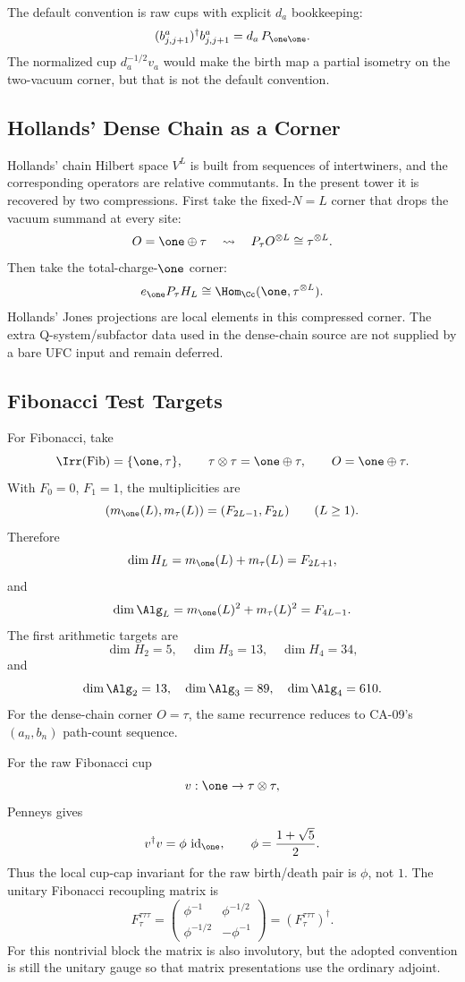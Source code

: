 The default convention is raw cups with explicit \(d_a\) bookkeeping:
\[
  (b^a_{j,j+1})^\dagger b^a_{j,j+1}
  =
  d_a\,P_{\one\one}.
\]
The normalized cup \(d_a^{-1/2}v_a\) would make the birth map a partial
isometry on the two-vacuum corner, but that is not the default convention.

\subsection{Hollands' Dense Chain as a Corner}

Hollands' chain Hilbert space \(V^L\) is built from sequences of intertwiners,
and the corresponding operators are relative commutants.  In the present
tower it is recovered by two compressions.  First take the fixed-\(N=L\) corner
that drops the vacuum summand at every site:
\[
  O=\one\oplus\tau
  \quad\leadsto\quad
  P_\tau O^{\otimes L}\cong \tau^{\otimes L}.
\]
Then take the total-charge-\(\one\) corner:
\[
  e_{\one}P_\tau H_L
  \cong
  \Hom_{\Cc}(\one,\tau^{\otimes L}).
\]
Hollands' Jones projections are local elements in this compressed corner.  The
extra Q-system/subfactor data used in the dense-chain source are not supplied
by a bare UFC input and remain deferred.

\subsection{Fibonacci Test Targets}

For Fibonacci, take
\[
  \Irr(\mathrm{Fib})=\{\one,\tau\},
  \qquad
  \tau\otimes\tau=\one\oplus\tau,
  \qquad
  O=\one\oplus\tau .
\]
With \(F_0=0\), \(F_1=1\), the multiplicities are
\[
  (m_{\one}(L),m_{\tau}(L))=(F_{2L-1},F_{2L})
  \qquad(L\ge1).
\]
Therefore
\[
  \dim H_L=m_{\one}(L)+m_{\tau}(L)=F_{2L+1},
\]
and
\[
  \dim\Alg_L=m_{\one}(L)^2+m_{\tau}(L)^2=F_{4L-1}.
\]
The first arithmetic targets are
\[
  \dim H_2=5,\quad \dim H_3=13,\quad \dim H_4=34,
\]
and
\[
  \dim\Alg_2=13,\quad \dim\Alg_3=89,\quad \dim\Alg_4=610.
\]
For the dense-chain corner \(O=\tau\), the same recurrence reduces to CA-09's
\((a_n,b_n)\) path-count sequence.

For the raw Fibonacci cup
\[
  v:\one\to\tau\otimes\tau,
\]
Penneys gives
\[
  v^\dagger v=\phi\,\operatorname{id}_{\one},
  \qquad
  \phi=\frac{1+\sqrt5}{2}.
\]
Thus the local cup-cap invariant for the raw birth/death pair is \(\phi\), not
\(1\).  The unitary Fibonacci recoupling matrix is
\[
  F^{\tau\tau\tau}_{\tau}
  =
  \begin{pmatrix}
    \phi^{-1} & \phi^{-1/2}\\
    \phi^{-1/2} & -\phi^{-1}
  \end{pmatrix}
  =
  \left(F^{\tau\tau\tau}_{\tau}\right)^\dagger .
\]
For this nontrivial block the matrix is also involutory, but the adopted
convention is still the unitary gauge so that matrix presentations use the
ordinary adjoint.

